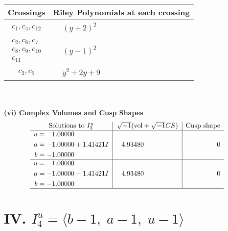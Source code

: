 \documentclass[1p]{elsarticle_modified}
\theoremstyle{definition}
\newcommand{\I}{\sqrt{-1}}
\begin{document}
\begin{tabular}{m{50pt}|m{274pt}}
Crossings & \hspace{64pt}Riley Polynomials at each crossing \\
\hline $$\begin{aligned}c_{1},c_{4},c_{12}\end{aligned}$$&$\begin{aligned}
&(y+2)^2
\end{aligned}$\\
\hline $$\begin{aligned}c_{2},c_{6},c_{7}\\c_{8},c_{9},c_{10}\\c_{11}\end{aligned}$$&$\begin{aligned}
&(y-1)^2
\end{aligned}$\\
\hline $$\begin{aligned}c_{3},c_{5}\end{aligned}$$&$\begin{aligned}
&y^2+2 y+9
\end{aligned}$\\
\hline
\end{tabular}\\~\\
\newpage\flushleft \textbf{(vi) Complex Volumes and Cusp Shapes}
$$\begin{array}{c|c|c}  
\text{Solutions to }I^u_{3}& \I (\text{vol} + \sqrt{-1}CS) & \text{Cusp shape}\\
 \hline 
\begin{aligned}
u &= \phantom{-}1.00000\phantom{ +0.000000I} \\
a &= -1.00000 + 1.41421 I \\
b &= -1.00000\phantom{ +0.000000I}\end{aligned}
 & \phantom{-}4.93480\phantom{ +0.000000I} & \phantom{-0.000000 } 0 \\ \hline\begin{aligned}
u &= \phantom{-}1.00000\phantom{ +0.000000I} \\
a &= -1.00000 - 1.41421 I \\
b &= -1.00000\phantom{ +0.000000I}\end{aligned}
 & \phantom{-}4.93480\phantom{ +0.000000I} & \phantom{-0.000000 } 0\\
 \hline 
 \end{array}$$\newpage\newpage\renewcommand{\arraystretch}{1}
\centering \section*{IV. $I^u_{4}= \langle b-1,\;a-1,\;u-1 \rangle$}
\end{document}

